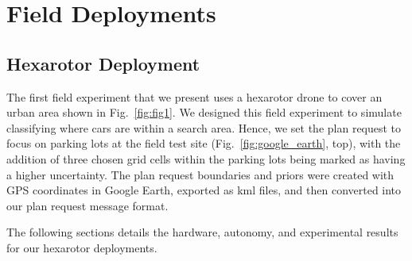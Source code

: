 \section{Field Deployments}\label{sec:field}


\subsection{Hexarotor Deployment}
The first field experiment that we present uses a hexarotor drone to cover an urban area shown in Fig.~\ref{fig:fig1}.
We designed this field experiment to simulate classifying where cars are within a search area.  
Hence, we set the plan request to focus on parking lots at the field test site (Fig.~\ref{fig:google_earth}, top), with the addition of three chosen grid cells within the parking lots being marked as having a higher uncertainty. The plan request boundaries and priors were created with GPS coordinates in Google Earth, exported as kml files, and then converted into our plan request message format. 

The following sections details the hardware, autonomy, and experimental results for our hexarotor deployments.

